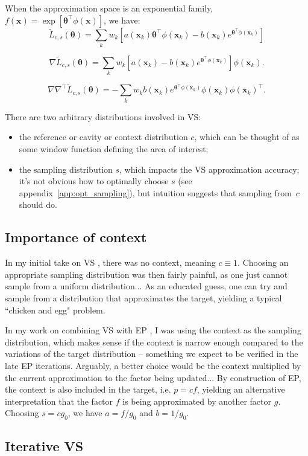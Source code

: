 \documentclass{article}
\def\x{{\mathbf{x}}}
\def\param{{\boldsymbol{\theta}}}
\begin{document}
When the approximation space is an exponential family, $f(\x) = \exp[\param^\top \phi(\x)]$, we have:
$$
\tilde{L}_{c,s}(\param)
= 
\sum_k 
w_k \left[
a(\x_k) \param^\top \phi(\x_k)
- b(\x_k) e^{\param^\top \phi(\x_k)}
\right]
$$


$$
\nabla \tilde{L}_{c,s}(\param)
= 
\sum_k 
w_k \left[
a(\x_k) 
- b(\x_k) e^{\param^\top \phi(\x_k)}
\right]
\phi(\x_k)
.
$$

$$
\nabla \nabla^\top \tilde{L}_{c,s}(\param)
= 
- \sum_k 
w_k 
b(\x_k) e^{\param^\top \phi(\x_k)}
\phi(\x_k) \phi(\x_k)^\top 
.
$$

There are two arbitrary distributions involved in VS:
\begin{itemize}
\item the reference or cavity or context distribution $c$, which can be thought of as some window function defining the area of interest;
\item the sampling distribution $s$, which impacts the VS approximation accuracy; it's not obvious how to optimally choose $s$ (see appendix~\ref{app:opt_sampling}), but intuition suggests that sampling from~$c$ should do.
\end{itemize}


\subsection{Importance of context}

In my initial take on VS \cite{ijasp:13}, there was no context, meaning $c\equiv 1$. Choosing an appropriate sampling distribution was then fairly painful, as one just cannot sample from a uniform distribution... As an educated guess, one can try and sample from a distribution that approximates the target, yielding a typical ``chicken and egg" problem.

In my work on combining VS with EP \cite{rr:16}, I was using the context as the sampling distribution, which makes sense if the context is narrow enough compared to the variations of the target distribution -- something we expect to be verified in the late EP iterations. Arguably, a better choice would be the context multiplied by the current approximation to the factor being updated... By construction of EP, the context is also included in the target, i.e. $p=cf$, yielding an alternative interpretation that the factor $f$ is being approximated by another factor $g$. Choosing $s=cg_0$, we have $a=f/g_0$ and $b=1/g_0$.


\subsection{Iterative VS}
\end{document}

